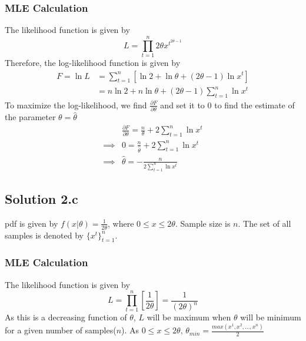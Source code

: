 \subsubsection*{MLE Calculation}
The likelihood function is given by
\begin{equation*}
L = \prod_{t=1}^n 2\theta x^{t^{2\theta -1}}
\end{equation*}
Therefore, the log-likelihood function is given by
\begin{equation*}
	\begin{split}
		F = \ln L &= \sum_{t=1}^n \left[\ln 2 + \ln \theta + (2\theta -1) \ln x^{t} \right]\\
		&= n \ln 2 + n\ln \theta + (2\theta -1) \sum_{t=1}^n \ln x^{t}
	\end{split}
\end{equation*}
To maximize the log-likelihood, we find $\frac{\partial F}{\partial \theta}$ and set it to $0$ to find the estimate of the parameter $\theta = \hat{\theta}$
\begin{equation*}
	\begin{split}
		& \frac{\partial F}{\partial \theta} = \frac{n}{\theta} + 2\sum_{t=1}^n \ln x^{t}\\
		\implies & 0 = \frac{n}{\hat{\theta}} + 2\sum_{t=1}^n \ln x^{t}\\
		\implies & \hat{\theta} = - \frac{n}{2\sum_{t=1}^n \ln x^{t}}
	\end{split}
\end{equation*}
\subsection*{Solution 2.c}
pdf is given by $f(x|\theta) = \frac{1}{2\theta}$, where $0 \leq x \leq 2\theta$. Sample size is $n$. The set of all samples is denoted by $\{x^t\}_{t=1}^n$.
\subsubsection*{MLE Calculation}
The likelihood function is given by
\begin{equation*}
L = \prod_{t=1}^n \left[\frac{1}{2\theta}\right] = \frac{1}{(2\theta)^n}
\end{equation*}
As this is a decreasing function of $\theta$, $L$ will be maximum when $\theta$ will be minimum for a given number of samples($n$). As $0 \leq x \leq 2\theta$, $\theta_{min} = \frac{max(x^1, x^2, \ldots, x^n)}{2}$